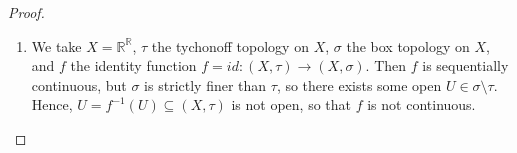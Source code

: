 \documentclass[12pt]{extarticle}
\newcommand{\R}{\mathbb{R}}
\newcommand{\<}{\langle}
\renewcommand{\>}{\rangle}
\theoremstyle{definition}
\begin{document}
\begin{proof}
\begin{enumerate}
\begin{enumerate}
    \end{enumerate}
  \item
    We take $X = \R^{\R}$, $\tau$ the tychonoff topology on $X$, $\sigma$ the box topology on $X$, and $f$ the identity function $f = id: (X, \tau) \to (X, \sigma)$. Then $f$ is sequentially continuous, but $\sigma$ is strictly
    finer than $\tau$, so there exists some open $U \in \sigma \setminus \tau$. Hence, $U = f^{-1}(U) \subseteq (X, \tau)$ is not open, so that $f$ is not continuous. 


    

  \end{enumerate}
\end{proof}
\end{document}
